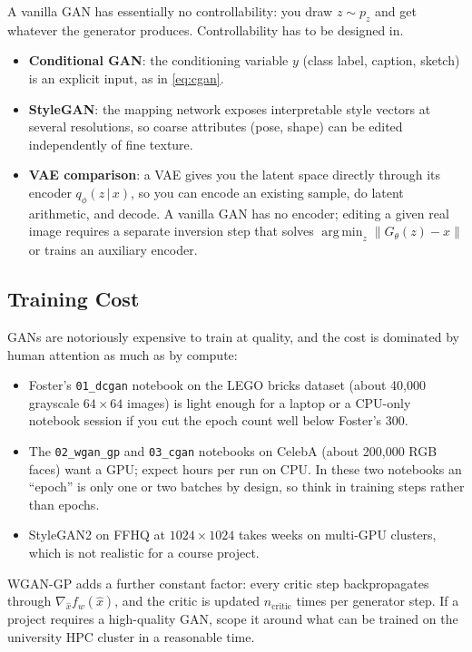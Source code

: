 \documentclass[11pt]{article}
\newcommand{\given}{\,\vert\,}
\DeclareMathOperator*{\argmin}{arg\,min}
\theoremstyle{remark}
\begin{document}
A vanilla GAN has essentially no controllability: you draw $z\sim p_z$ and get whatever the generator produces. Controllability has to be designed in.
\begin{itemize}
    \item \textbf{Conditional GAN}: the conditioning variable $y$ (class label, caption, sketch) is an explicit input, as in \eqref{eq:cgan}.
    \item \textbf{StyleGAN}: the mapping network exposes interpretable style vectors at several resolutions, so coarse attributes (pose, shape) can be edited independently of fine texture.
    \item \textbf{VAE comparison}: a VAE gives you the latent space directly through its encoder $q_\phi(z\given x)$, so you can encode an existing sample, do latent arithmetic, and decode. A vanilla GAN has no encoder; editing a given real image requires a separate inversion step that solves $\argmin_z \|G_\theta(z)-x\|$ or trains an auxiliary encoder.
\end{itemize}

\subsection{Training Cost}

GANs are notoriously expensive to train at quality, and the cost is dominated by human attention as much as by compute:
\begin{itemize}
    \item Foster's \texttt{01\_dcgan} notebook on the LEGO bricks dataset (about 40{,}000 grayscale $64\times 64$ images) is light enough for a laptop or a CPU-only notebook session if you cut the epoch count well below Foster's 300.
    \item The \texttt{02\_wgan\_gp} and \texttt{03\_cgan} notebooks on CelebA (about 200{,}000 RGB faces) want a GPU; expect hours per run on CPU. In these two notebooks an ``epoch'' is only one or two batches by design, so think in training steps rather than epochs.
    \item StyleGAN2 on FFHQ at $1024\times 1024$ takes weeks on multi-GPU clusters, which is not realistic for a course project.
\end{itemize}
WGAN-GP adds a further constant factor: every critic step backpropagates through $\nabla_{\hat x} f_w(\hat x)$, and the critic is updated $n_{\text{critic}}$ times per generator step. If a project requires a high-quality GAN, scope it around what can be trained on the university HPC cluster in a reasonable time.
\end{document}
